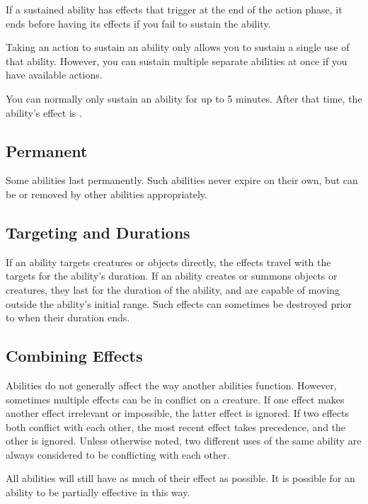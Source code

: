         If a sustained ability has effects that trigger at the end of the action phase, it ends before having its effects if you fail to sustain the ability.

        Taking an action to sustain an ability only allows you to sustain a single use of that ability.
        However, you can sustain multiple separate abilities at once if you have available actions.

        You can normally only sustain an ability for up to 5 minutes.
        After that time, the ability's effect is .

    \subsection{Permanent}
        Some abilities last permanently.
        Such abilities never expire on their own, but can be  or removed by other abilities appropriately.

    \subsection{Targeting and Durations}
        If an ability targets creatures or objects directly, the effects travel with the targets for the ability's duration.
        If an ability creates or summons objects or creatures, they last for the duration of the ability, and are capable of moving outside the ability's initial range.
        Such effects can sometimes be destroyed prior to when their duration ends.

    \subsection{Combining Effects}
        Abilities do not generally affect the way another abilities function.
        However, sometimes multiple effects can be in conflict on a creature.
        If one effect makes another effect irrelevant or impossible, the latter effect is ignored.
        If two effects both conflict with each other, the most recent effect takes precedence, and the other is ignored.
        Unless otherwise noted, two different uses of the same ability are always considered to be conflicting with each other.

        All abilities will still have as much of their effect as possible.
        It is possible for an ability to be partially effective in this way.

